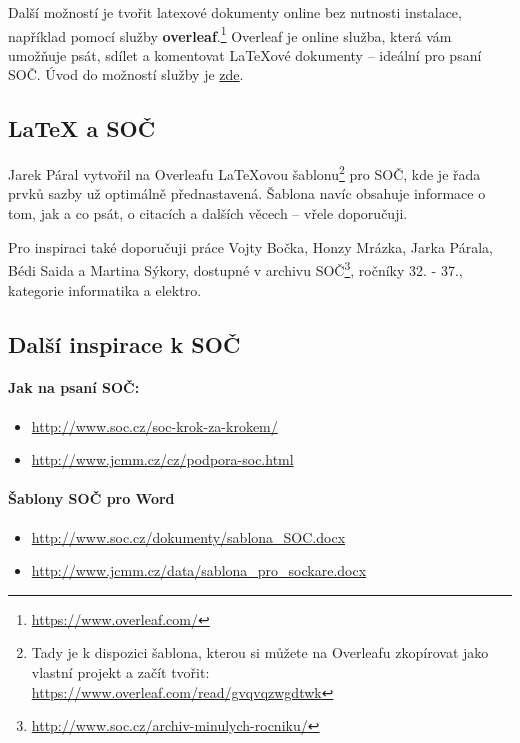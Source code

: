 Další možností je tvořit latexové dokumenty online bez nutnosti instalace, například pomocí služby 
{\bf overleaf}.\footnote{\url{https://www.overleaf.com/}} Overleaf je online služba, která vám umožňuje psát, sdílet a komentovat LaTeXové dokumenty -- ideální pro psaní SOČ. Úvod do možností služby je 
\href{http://www.kutac.cz/blog/pocitace-a-internety/overleaf-online-latex-editor/}{zde}.  


\subsection{\LaTeX{} a SOČ}

Jarek Páral vytvořil na Overleafu LaTeXovou šablonu\footnote{Tady je k dispozici šablona, kterou si můžete na Overleafu zkopírovat jako vlastní projekt a začít tvořit: \url{https://www.overleaf.com/read/gvqvqzwgdtwk} }
 pro SOČ, kde je řada prvků sazby už optimálně přednastavená. 
 Šablona navíc obsahuje informace o tom, jak a co psát, o citacích a dalších věcech -- vřele doporučuji. 

Pro inspiraci také doporučuji práce Vojty Bočka, Honzy Mrázka, Jarka Párala, Bédi Saida a Martina Sýkory, dostupné v archivu SOČ\footnote{\url{http://www.soc.cz/archiv-minulych-rocniku/}}, ročníky 32. - 37., kategorie informatika a elektro.

\subsection{Další inspirace k SOČ}

	 \paragraph{Jak na psaní SOČ:}
		\begin{itemize}
			\item \url{http://www.soc.cz/soc-krok-za-krokem/}
			\item \url{http://www.jcmm.cz/cz/podpora-soc.html}		
		\end{itemize}

	\paragraph{Šablony SOČ pro Word}
	\begin{itemize}
		\item \url{http://www.soc.cz/dokumenty/sablona_SOC.docx}
		\item \url{http://www.jcmm.cz/data/sablona_pro_sockare.docx}
	\end{itemize}

